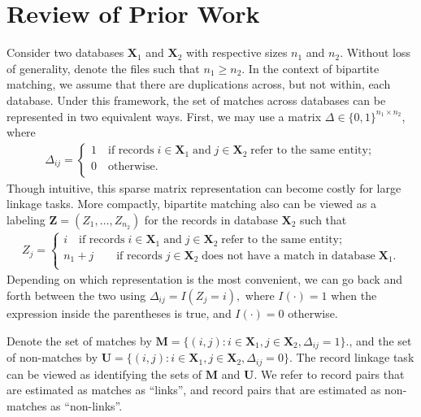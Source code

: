 \documentclass[ba]{imsart}
\begin{document}
\section{Review of Prior Work}
\label{sec:review-of_prior-work}

Consider two databases $\bm{X}_1$ and $\bm{X}_2$ with respective sizes $n_1$ and $n_2$. Without loss of generality, denote the files such that $n_1 \geq n_2$. In the context of bipartite matching, we assume that there are duplications across, but not within, each database. Under this framework, the set of matches across databases can be represented in two equivalent ways. First, we may use a matrix $\Delta \in \{0, 1\}^{n_1 \times n_2}$, where
\begin{align}
	\Delta_{ij} =
	\begin{cases}
		1 \quad \text{if records}\;  i \in \bm{X}_1 \; \text{and}\; j\in \bm{X}_2 \; \text{refer to the same entity}; \\
		0 \quad \text{otherwise}.\\
	\end{cases}
\end{align}
Though intuitive, this sparse matrix representation can become costly for large linkage tasks. More compactly, bipartite matching also can be viewed as a labeling $\bm{Z} = (Z_1, \ldots, Z_{n_2})$ for the records in database $\bm{X}_2$ such that 
\begin{align}
	Z_{j} =
	\begin{cases}
		i \quad \text{if records}\;  i \in \bm{X}_1 \; \text{and}\; j\in \bm{X}_2 \; \text{refer to the same entity}; \\
		n_1 + j \quad  \quad \text{if records}\;  j \in \bm{X}_2 \; \text{does not have a match in database}\; \bm{X}_1. \\
	\end{cases}
\end{align}
Depending on which representation is the most convenient, we can go back and forth between the two using $\Delta_{ij} = I(Z_j = i),$ where $I(\cdot) = 1$ when the expression inside the parentheses is true, and $I(\cdot) = 0$ otherwise. 

Denote the set of matches by $\bm{M} = \{(i,j): i \in \bm{X}_1, j \in \bm{X}_2, \Delta_{ij} = 1\}.$, and the set of non-matches by 
$\bm{U} =  \{(i,j): i \in \bm{X}_1, j \in \bm{X}_2, \Delta_{ij} = 0\}.$ The record linkage task can be viewed as identifying the sets of  $\bm{M}$ and  $\bm{U}.$ We refer to record pairs that are estimated as matches as ``links'', and record pairs that are estimated as non-matches as ``non-links''.
\end{document}
